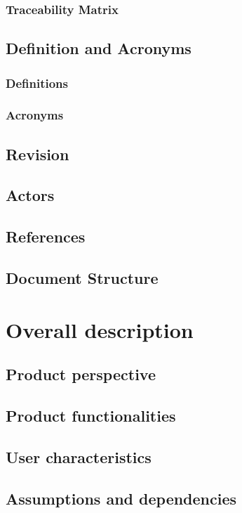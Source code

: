 \documentclass[12pt]{article}
\begin{document}
	\subsubsection{Traceability Matrix}
	
	\subsection{Definition and Acronyms}
	\subsubsection{Definitions}
	\subsubsection{Acronyms}
	\subsection{Revision}
	\subsection{Actors}
	
	\subsection{References}
	
	\subsection{Document Structure}
	
	\clearpage
	\section{Overall description}
	\subsection{Product perspective}
	
	\subsection{Product functionalities}
	\subsection{User characteristics}
	
	
	\subsection{Assumptions and dependencies}
\end{document}
